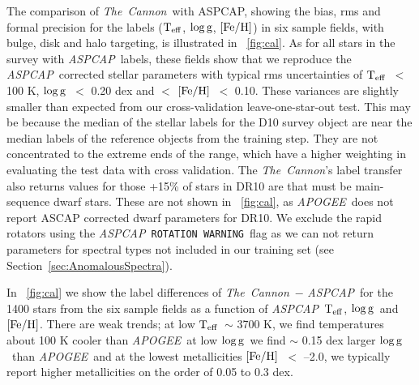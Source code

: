 \documentclass[12pt, preprint]{aastex}
\newcommand{\sectionname}{Section}
\newcommand{\teff}{\mbox{$\rm T_{eff}$}}
\newcommand{\feh}{\mbox{$\rm [Fe/H]$}}
\newcommand{\logg}{\mbox{$\rm \log g$}}
\newcommand{\tc}{\textsl{The~Cannon}}
\newcommand{\apogee}{\textsl{APOGEE}}
\newcommand{\aspcap}{\textsl{ASPCAP}}
\newcommand{\rotwarn}{\texttt{ROTATION WARNING}}
\begin{document}
The comparison of \tc\ with ASPCAP, showing the bias, rms and formal precision for the labels (\teff , \logg , \feh ) in six sample fields, with bulge, disk and halo targeting, is illustrated in \figurename~\ref{fig:cal}. As for all stars in the survey with \aspcap\ labels, these fields show that we reproduce the \aspcap\ corrected stellar parameters with typical rms uncertainties of \teff\ $<$ 100 K, \logg\ $<$ 0.20 dex and $<$ \feh\ $<$ 0.10. These variances are slightly smaller than expected from our cross-validation leave-one-star-out test. This may be because the median of the stellar labels for the D10 survey object are near the median labels of the reference objects from the training step. 
They are not concentrated to the extreme ends of the range, which have a higher weighting in evaluating the test data with cross validation. 
The \tc 's label transfer also returns values for those +15\% of stars in DR10 are that must be main-sequence dwarf stars. 
These are not shown in \figurename~\ref{fig:cal}, as \apogee\ does not report ASCAP corrected dwarf parameters for DR10. 
We exclude the rapid rotators using the \aspcap\ \rotwarn\ flag as we can not return parameters for spectral types not included in our training set (see \sectionname~\ref{sec:AnomalousSpectra}). 

In \figurename~\ref{fig:cal} we show the label differences of \tc\ $-$ \aspcap\ for the 1400 stars from the six sample fields as a function of \aspcap\ \teff, \logg\ and \feh. There are weak trends; at low \teff\ $\sim$ 3700 K, we find temperatures about 100 K cooler than \apogee\, at low \logg\ we find $\sim$ 0.15 dex larger \logg\ than \apogee\ and at the lowest metallicities \feh\ $<$ --2.0, we typically report higher metallicities on the order of 0.05 to 0.3 dex.
\end{document}
